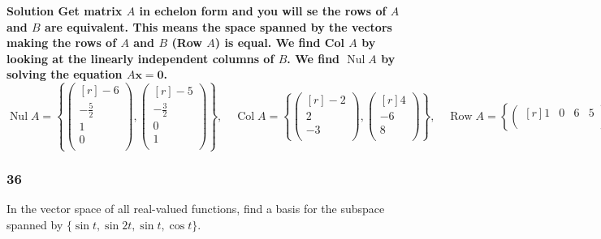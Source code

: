       \bf{Solution} \newline \newline
      Get matrix $ A $ in echelon form and you will se the rows of $ A $ and $ B $ are equivalent. This means the space spanned by the vectors making the rows of $ A $ and $ B $ (Row $ A $) is equal. We find Col $ A $ by looking at the linearly independent columns of $ B $. We find $ \operatorname{Nul}A $ by solving the equation $ A \mathbf{x} = \mathbf 0 $. 
      \[
      \operatorname{Nul}A = \left\{ 
        \begin{pmatrix*}[r]
         -6 \\
         -\frac{5}{2} \\
         1 \\
         0 \\
        \end{pmatrix*}, 
        \begin{pmatrix*}[r]
         -5 \\
         -\frac{3}{2} \\
         0 \\
         1 \\
        \end{pmatrix*}
       \right\}, \quad
       \operatorname{Col}A = \left\{ 
        \begin{pmatrix*}[r]
         -2 \\
         2 \\
         -3 \\
        \end{pmatrix*}, 
        \begin{pmatrix*}[r]
         4 \\
         -6 \\
         8 \\
        \end{pmatrix*}
        \right\} , \quad
        \operatorname{Row}A = \left\{
          \begin{pmatrix*}[r]
           1 & 0 & 6 & 5 \\
          \end{pmatrix*}, 
          \begin{pmatrix*}[r]
           0 & 2 & 5 & 3 \\
          \end{pmatrix*}
        \right\}_{}^{} 
      \]

    \subsubsection*{36}  
      In the vector space of all real-valued functions, find a basis for the subspace spanned by $ \{ \sin t, \sin 2t, \sin t, \cos t \}$. 

